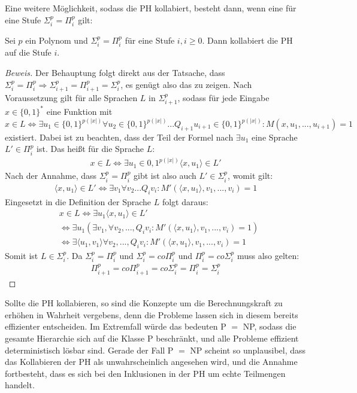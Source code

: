 Eine weitere Möglichkeit, sodass die PH kollabiert, besteht dann, wenn eine für eine Stufe $\Sigma^p_i = \Pi^p_i$ gilt:

\begin{theorem}
    Sei $p$ ein Polynom und $\Sigma^p_i = \Pi^p_i$ für eine Stufe $i, i \geq 0$. Dann kollabiert die PH auf die Stufe $i$.
\end{theorem}

\begin{proof}[Beweis]
    Der Behauptung folgt direkt aus der Tatsache, dass $\Sigma^p_i = \Pi^p_i \Rightarrow \Sigma^p_{i+1} = \Pi^p_{i+1} = \Sigma^p_i$, es genügt also das zu zeigen.
    Nach Voraussetzung gilt für alle Sprachen $L$ in $\Sigma^p_{i+1}$, sodass für jede Eingabe $x \in \{0,1\}^*$ eine Funktion mit 
    $$
    x \in L \Leftrightarrow \exists u_1 \in \{0,1\}^{p(|x|)} \forall u_2 \in \{0,1\}^{p(|x|)} ... Q_{i+1}u_{i + 1} \in \{0,1\}^{p(|x|)} : M(x, u_1, ..., u_{i+1}) = 1
    $$
    existiert.
    Dabei ist zu beachten, dass der Teil der Formel nach $\exists u_1$ eine Sprache $L' \in \Pi^p_i$ ist.
    Das heißt für die Sprache $L$:
    \begin{align*}
    x \in L \Leftrightarrow \exists u_1 \in {0,1}^{p(|x|)} \langle x, u_1 \rangle \in L'
    \end{align*}
    Nach der Annahme, dass  $\Sigma^p_i = \Pi^p_i$ gibt ist also auch $L' \in \Sigma^p_i$, womit gilt:
    \begin{align*}
    \langle x, u_1 \rangle \in L' \Leftrightarrow \exists v_1 \forall v_2 ... Q_i v_i : M'(\langle x, u_1 \rangle, v_1, ..., v_i) = 1 
    \end{align*}
    Eingesetzt in die Definition der Sprache $L$ folgt daraus:
    \begin{align*}
    & x \in L \Leftrightarrow \exists u_1 \langle x, u_1 \rangle \in L' \\
    & \Leftrightarrow \exists u_1 (\exists v_1, \forall v_2, ..., Q_i v_i :  M'(\langle x, u_1 \rangle, v_1, ..., v_i) = 1) \\
    & \Leftrightarrow \exists \langle u_1, v_1 \rangle \forall v_2, ..., Q_i v_i : M'(\langle x, u_1 \rangle, v_1, ..., v_i) = 1
    \end{align*}
    Somit ist $L \in \Sigma^p_i$. Da $\Sigma^p_i = \Pi^p_i$ und $\Sigma^p_i = co\Pi^p_i$ und $\Pi^p_i = co\Sigma^p_i$ muss also gelten:
    \begin{align*}
    \Pi^p_{i+1} = co\Pi^p_{i+1} = co\Sigma^p_i = \Pi^p_i = \Sigma^p_i
    \end{align*}
\end{proof}

Sollte die PH kollabieren, so sind die Konzepte um die Berechnungskraft zu erhöhen in Wahrheit vergebens, denn die Probleme lassen sich in diesem bereits effizienter entscheiden.
Im Extremfall würde das bedeuten P $=$ NP, sodass die gesamte Hierarchie sich auf die Klasse P beschränkt, und alle Probleme effizient deterministisch lösbar sind.
Gerade der Fall P $=$ NP scheint so unplausibel, dass das Kollabieren der PH als unwahrscheinlich angesehen wird, und die Annahme fortbesteht, dass es sich bei den Inklusionen in der PH um echte Teilmengen handelt.
